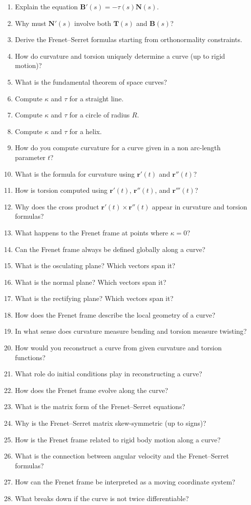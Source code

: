 \begin{enumerate}
  \item Explain the equation \(\mathbf{B}'(s) = -\tau(s)\mathbf{N}(s)\).
  \item Why must \(\mathbf{N}'(s)\) involve both \(\mathbf{T}(s)\) and \(\mathbf{B}(s)\)?
  \item Derive the Frenet--Serret formulas starting from orthonormality constraints.
  \item How do curvature and torsion uniquely determine a curve (up to rigid motion)?
  \item What is the fundamental theorem of space curves?
  \item Compute \(\kappa\) and \(\tau\) for a straight line.
  \item Compute \(\kappa\) and \(\tau\) for a circle of radius \(R\).
  \item Compute \(\kappa\) and \(\tau\) for a helix.
  \item How do you compute curvature for a curve given in a non arc-length parameter \(t\)?
  \item What is the formula for curvature using \(\mathbf{r}'(t)\) and \(\mathbf{r}''(t)\)?
  \item How is torsion computed using \(\mathbf{r}'(t)\), \(\mathbf{r}''(t)\), and \(\mathbf{r}'''(t)\)?
  \item Why does the cross product \(\mathbf{r}'(t) \times \mathbf{r}''(t)\) appear in curvature and torsion formulas?
  \item What happens to the Frenet frame at points where \(\kappa = 0\)?
  \item Can the Frenet frame always be defined globally along a curve?
  \item What is the osculating plane? Which vectors span it?
  \item What is the normal plane? Which vectors span it?
  \item What is the rectifying plane? Which vectors span it?
  \item How does the Frenet frame describe the local geometry of a curve?
  \item In what sense does curvature measure bending and torsion measure twisting?
  \item How would you reconstruct a curve from given curvature and torsion functions?
  \item What role do initial conditions play in reconstructing a curve?
  \item How does the Frenet frame evolve along the curve?
  \item What is the matrix form of the Frenet--Serret equations?
  \item Why is the Frenet--Serret matrix skew-symmetric (up to signs)?
  \item How is the Frenet frame related to rigid body motion along a curve?
  \item What is the connection between angular velocity and the Frenet--Serret formulas?
  \item How can the Frenet frame be interpreted as a moving coordinate system?
  \item What breaks down if the curve is not twice differentiable?
\end{enumerate}
